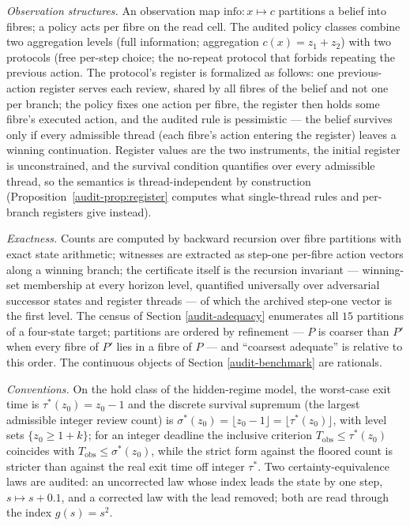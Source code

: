 \documentclass[10pt,twocolumn]{article}
\theoremstyle{plain}
\theoremstyle{definition}
\theoremstyle{remark}
\begin{document}
\emph{Observation structures.} An observation map
\(\mathrm{info}: x \mapsto c\) partitions a belief into fibres; a policy
acts per fibre on the read cell. The audited policy classes combine two
aggregation levels (full information; aggregation
\(c(x) = z_1 + z_2\)) with two protocols (free per-step choice; the
no-repeat protocol that forbids repeating the previous action. The
protocol's register is formalized as follows: one previous-action register
serves each review, shared by all fibres of the belief and not one per
branch; the policy fixes one action per fibre, the register then holds
some fibre's executed action, and the audited rule is pessimistic --- the
belief survives only if every admissible thread (each fibre's action
entering the register) leaves a winning continuation. Register values are
the two instruments, the initial register is unconstrained, and the survival condition quantifies over every
admissible thread, so the semantics is thread-independent by
construction (Proposition~\ref{audit-prop:register} computes what
single-thread rules and per-branch registers give instead).

\emph{Exactness.} Counts are computed by backward recursion over fibre
partitions with exact state arithmetic; witnesses are extracted as step-one per-fibre action vectors along a winning branch; the certificate itself is the recursion invariant --- winning-set membership at every horizon level, quantified universally over adversarial successor states and register threads --- of which the archived step-one vector is the first level. The census of
Section \ref{audit-adequacy} enumerates all \(15\) partitions of a four-state
target; partitions are ordered by refinement --- \(P\) is coarser than
\(P'\) when every fibre of \(P'\) lies in a fibre of \(P\) --- and
``coarsest adequate'' is relative to this order. The continuous objects of Section \ref{audit-benchmark} are rationals.

\emph{Conventions.} On the hold class of the hidden-regime model, the
worst-case exit time is \(\tau^{*}(z_0) = z_0 - 1\) and the discrete
survival supremum (the largest admissible integer review count) is
\(\sigma^{*}(z_0) = \lfloor z_0 - 1 \rfloor = \lfloor \tau^{*}(z_0)
\rfloor\), with level sets \(\{z_0 \ge 1 + k\}\); for an integer deadline
the inclusive criterion \(T_{\mathrm{obs}} \le \tau^{*}(z_0)\) coincides
with \(T_{\mathrm{obs}} \le \sigma^{*}(z_0)\), while the strict form
against the floored count is stricter than against the real exit time off
integer \(\tau^{*}\). Two
certainty-equivalence laws are audited: an uncorrected law whose index
leads the state by one step, \(s \mapsto s + 0.1\), and a corrected law
with the lead removed; both are read through the index \(g(s) = s^{2}\).
\end{document}
